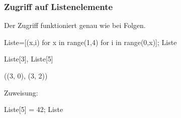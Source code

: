 \documentclass[fontsize=12pt,paper=a4,twoside,bibtotoc,idxtotoc,
liststotoc,pagesize,BCOR1.2cm,DIV15,chapterprefix,pagesize=pdftex]{scrbook}
\theoremstyle{plain}
\theoremstyle{definition}
\theoremstyle{remark}
\begin{document}
\subsubsection{Zugriff auf Listenelemente}
Der Zugriff funktioniert genau wie bei Folgen.
\begin{sagein}
Liste=[(x,i) for x in range(1,4) for i in range(0,x)];  Liste
\end{sagein}
\begin{sage}
[(1, 0), (2, 0), (2, 1), (3, 0), (3, 1), (3, 2)]
\end{sage}
\begin{sagein}
Liste[3], Liste[5]
\end{sagein}
\begin{sage}
((3, 0), (3, 2))
\end{sage}
 Zuweisung:
\begin{sagein}
Liste[5] = 42; Liste
\end{sagein}
\begin{sage}
  [(1, 0), (2, 0), (2, 1), (3, 0), (3, 1), 42]
\end{sage}
\end{document}
